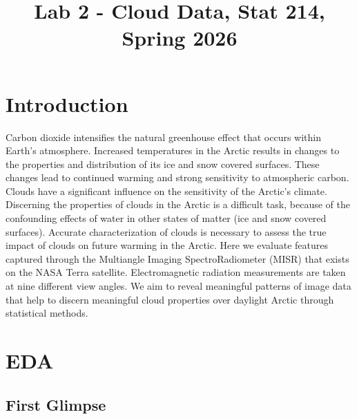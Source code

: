 \documentclass[10pt,letterpaper]{article}
\title{Lab 2 - Cloud Data, Stat 214, Spring 2026\vspace{-2em}}
\begin{document}
\maketitle


\section{Introduction}

Carbon dioxide intensifies the natural greenhouse effect that occurs within Earth’s atmosphere. Increased temperatures in the Arctic results in changes to the properties and distribution of its ice and snow covered surfaces. These changes lead to continued warming and strong sensitivity to atmospheric carbon. Clouds have a significant influence on the sensitivity of the Arctic's climate. Discerning the properties of clouds in the Arctic is a difficult task, because of the confounding effects of water in other states of matter (ice and snow covered surfaces). Accurate characterization of clouds is necessary to assess the true impact of clouds on future warming in the Arctic. Here we evaluate features captured through the Multiangle Imaging SpectroRadiometer (MISR) that exists on the NASA Terra satellite. Electromagnetic radiation measurements are taken at nine different view angles. We aim to reveal meaningful patterns of image data that help to discern meaningful cloud properties over daylight Arctic through statistical methods. 

\section{EDA}

\subsection{First Glimpse}
\end{document}
